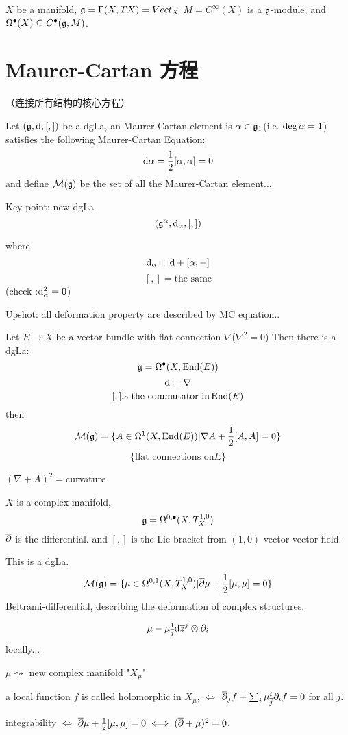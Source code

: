 \begin{example}
$X$ be a manifold, $\mathfrak{g}=\Gamma(X,TX)=Vect_X$
$M=C^\infty(X)$ is a $\mathfrak{g}$-module, and
$\Omega^{\bullet}(X)\subseteq C^{\bullet}(\mathfrak{g},M)$.
\end{example}

\section{Maurer-Cartan 方程}
（连接所有结构的核心方程）

Let $(\mathfrak{g},\mathrm{d},[,])$ be a dgLa, an
Maurer-Cartan element is  $\alpha\in\mathfrak{g}_1$(i.e. $\deg\alpha=1$)
satisfies the following Maurer-Cartan Equation:
$$\mathrm{d}\alpha=\frac{1}{2}[\alpha,\alpha]=0$$
and define $\mathcal{M}(\mathfrak{g})$ be the set of all the Maurer-Cartan element...

Key point: new dgLa
$$(\mathfrak{g}^\alpha,\mathrm{d}_\alpha,[,])$$

where
$$\mathrm{d}_{\alpha}=\mathrm{d}+[\alpha,-]$$
$$[,]=\text{the same}$$
(check :$\mathrm{d}_\alpha^2=0$)

Upshot: all deformation property are described by MC equation..

\begin{example}
Let $E\to X$ be a vector bundle with flat connection $\nabla$($\nabla^2=0$)
Then there is a dgLa:
$$\mathfrak{g}=\Omega^{\bullet}(X,\operatorname{End}(E))$$
$$\mathrm{d}=\nabla$$
$$[,]\text{is the commutator in}\operatorname{End}(E)$$
then
$$\mathcal{M}(\mathfrak{g})=\{A\in\Omega^1(X,\operatorname{End}(E))|\nabla A+\frac{1}{2}[A,A]=0\}$$
$$\{\text{flat connections on} E\}$$

$(\nabla+A)^2=$curvature
\end{example}

\begin{example}
$X$ is a complex manifold,
$$\mathfrak{g}=\Omega^{0,\bullet}(X,T_X^{1,0})$$
$\overline{\partial}$ is the differential. and
$[,]$ is the Lie bracket from $(1,0)$ vector vector field.

This is a dgLa.
$$\mathcal{M}(\mathfrak{g})=
\{\mu\in\Omega^{0,1}(X,T_X^{1,0})|
\overline{\partial}\mu+\frac{1}{2}[\mu,\mu]=0
\}$$
Beltrami-differential, describing the deformation of complex structures.
\end{example}

$$\mu-\mu^1_{\overline{j}}\mathrm{d}\overline{z}^j\otimes\partial_i$$
locally...

$\mu\rightsquigarrow$ new complex manifold "$X_\mu$"

a local function $f$ is called holomorphic in $X_\mu$,
$\iff$ $\overline{\partial}_jf+\sum_i\mu^i_{\overline{j}}\partial_if=0$ for all $j$.

integrability $\iff$ $\overline{\partial}\mu+\frac{1}{2}[\mu,\mu]=0\iff(\overline{\partial}+\mu)^2=0$.

